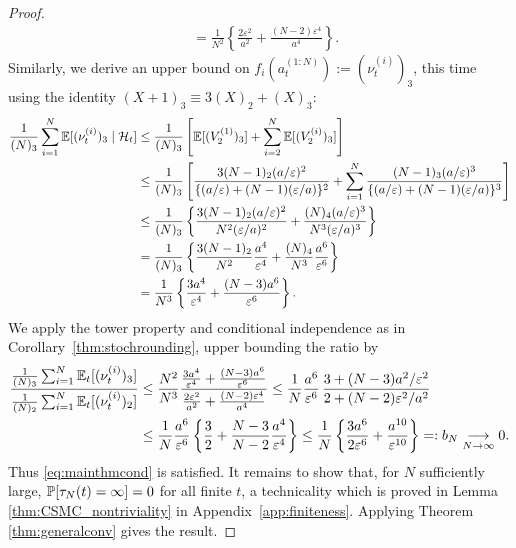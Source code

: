 \begin{proof}
\begin{align}
&= \frac{1}{N^2} \left\{\frac{2\varepsilon^2}{a^2} + \frac{(N-2)\varepsilon^4}{a^4}  \right\} . \label{eq:CSMC_cN_LB}
\end{align}
Similarly, we derive an upper bound on $f_i(a_t^{(1:N)}) := (\nu_t^{(i)})_3$, this time using the identity $(X+1)_3 \equiv 3(X)_2 +(X)_3 $:
\begin{align*}
\frac{1}{(N)_3} \sum_{i=1}^N \mathbb{E}[ (\nu_t^{(i)})_3 \mid \mathcal{H}_t]
&\leq \frac{1}{(N)_3} \left[ \mathbb{E}[ (V_2^{(1)})_3 ] + \sum_{i=2}^N \mathbb{E}[ (V_2^{(i)})_3 ] \right] \\
&\leq \frac{1}{(N)_3} \left[ \frac{ 3 (N-1)_2 (a/\varepsilon)^2}{\{(a/\varepsilon) + (N-1)(\varepsilon/a)\}^2} + \sum_{i=1}^N \frac{(N-1)_3 (a/\varepsilon)^3}{\{(a/\varepsilon) + (N-1)(\varepsilon/a)\}^3} \right] \\
&\leq \frac{1}{(N)_3} \left\{ \frac{3(N-1)_2 (a/\varepsilon)^2}{N^2 (\varepsilon/a)^2} + \frac{(N)_4 (a/\varepsilon)^3}{N^3 (\varepsilon/a)^3} \right\} \\
&= \frac{1}{(N)_3} \left\{ \frac{3(N-1)_2}{N^2} \frac{a^4}{\varepsilon^4} +\frac{(N)_4}{N^3} \frac{a^6}{\varepsilon^6} \right\} \\
&= \frac{1}{N^3} \left\{ \frac{3a^4}{\varepsilon^4} + \frac{(N-3) a^6}{\varepsilon^6} \right\} .
\end{align*}
We apply the tower property and conditional independence as in Corollary~\ref{thm:stochrounding}, upper bounding the ratio by
\begin{align*}
\frac{\frac{1}{(N)_3} \sum_{i=1}^N \mathbb{E}_t[ (\nu_t^{(i)})_3 ]}{\frac{1}{(N)_2} \sum_{i=1}^N \mathbb{E}_t[ (\nu_t^{(i)})_2 ]}
&\leq \frac{N^2}{N^3} \frac{ \frac{3a^4}{\varepsilon^4} + \frac{(N-3)a^6}{\varepsilon^6} }{ \frac{2\varepsilon^2}{a^2} + \frac{(N-2)\varepsilon^4}{a^4} }
\leq \frac{1}{N} \frac{a^6}{\varepsilon^6}\, \frac{3 + (N-3) a^2 / \varepsilon^2 }{2 + (N-2) \varepsilon^2 / a^2} \\
&\leq \frac{1}{N} \frac{a^6}{\varepsilon^6} \left\{ \frac{3}{2} + \frac{N-3}{N-2} \frac{a^4}{\varepsilon^4} \right\}
\leq \frac{1}{N} \left\{ \frac{3 a^6}{2 \varepsilon^6} + \frac{a^{10}}{\varepsilon^{10}} \right\}
=: b_N \underset{N\to\infty}{\longrightarrow} 0.
\end{align*}
Thus \eqref{eq:mainthmcond} is satisfied. It remains to show that, for $N$ sufficiently large, $\mathbb{P}[ \tau_N(t) = \infty ] =0$ for all finite $t$, a technicality which is proved in Lemma \ref{thm:CSMC_nontriviality} in Appendix~\ref{app:finiteness}. Applying Theorem \ref{thm:generalconv} gives the result.
\end{proof}


